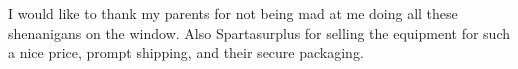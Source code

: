 I would like to thank my parents for not being mad at me doing all these shenanigans on the window. Also Spartasurplus for selling the equipment for such a nice price, prompt shipping, and their secure packaging.
